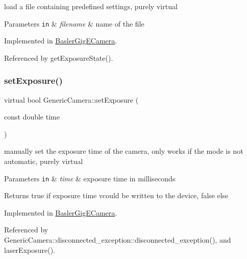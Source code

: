 load a file containing predefined settings, purely virtual 
\begin{DoxyParams}[1]{Parameters}
\mbox{\tt in}  & {\em filename} & name of the file \\
\hline
\end{DoxyParams}


Implemented in \hyperlink{classBaslerGigECamera_aa7e8cde9ecc7b2375146f41a6e35840e}{Basler\+Gig\+E\+Camera}.



Referenced by get\+Exposure\+State().

\mbox{\label{classGenericCamera_a62365678e9254bde587de4a50ffb7887}} 
\subsubsection{\texorpdfstring{set\+Exposure()}{setExposure()}}
{\footnotesize\ttfamily virtual bool Generic\+Camera\+::set\+Exposure (\begin{DoxyParamCaption}\item[{const double}]{time }\end{DoxyParamCaption})\hspace{0.3cm}{\ttfamily [pure virtual]}}

manually set the exposure time of the camera, only works if the mode is not automatic, purely virtual 
\begin{DoxyParams}[1]{Parameters}
\mbox{\tt in}  & {\em time} & exposure time in milliseconds \\
\hline
\end{DoxyParams}
\begin{DoxyReturn}{Returns}
true if exposure time vcould be written to the device, false else 
\end{DoxyReturn}


Implemented in \hyperlink{classBaslerGigECamera_a99f9cd699aac5cb1025cb7086fbba7c0}{Basler\+Gig\+E\+Camera}.



Referenced by Generic\+Camera\+::disconnected\+\_\+exception\+::disconnected\+\_\+exception(), and laser\+Exposure().

\mbox{\label{classGenericCamera_a5c3bd3ca0d691cf9026f8c91b3cf7c66}} 
